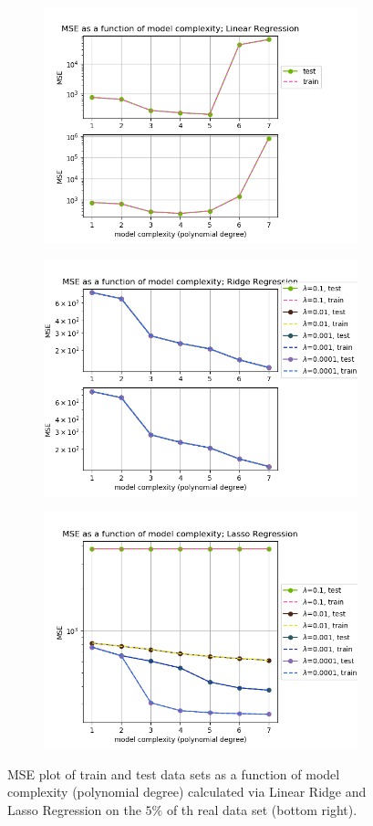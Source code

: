 \begin{figure}[ht]
\begin{subfigure}{\textwidth}
  \centering
  \includegraphics[width=0.55\linewidth]{images/real_part/real_linear_mse_p07_nreal.png}
\end{subfigure}
\begin{subfigure}{\textwidth}
  \centering
  \includegraphics[width=0.55\linewidth]{images/real_part/real_ridge_mse_p07_nreal.png}
\end{subfigure}
\begin{subfigure}{\textwidth}
  \centering
  \includegraphics[width=0.55\linewidth]{images/real_part/real_lasso_mse_p07_nreal.png}
\end{subfigure}
\caption{MSE plot of train and test data sets as a function of model complexity (polynomial degree) calculated via Linear Ridge and Lasso Regression on the $5\%$ of th real data set (bottom right).}
\label{fig:linear-mse-real-small}
\end{figure}


